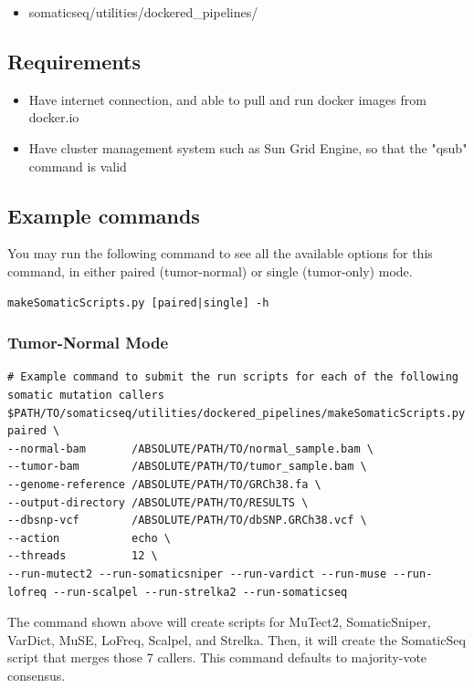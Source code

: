 \documentclass[10pt,letterpaper]{article}
\begin{document}
\begin{sloppypar}
  \begin{itemize}
    \item somaticseq/utilities/dockered\_pipelines/
  \end{itemize}

\subsection{Requirements}

  \begin{itemize}
    \item Have internet connection, and able to pull and run docker images from docker.io
    \item Have cluster management system such as Sun Grid Engine, so that the "qsub" command is valid
  \end{itemize}


\subsection{Example commands}

You may run the following command to see all the available options for this command, in either paired (tumor-normal) or single (tumor-only) mode.

\begin{lstlisting}
makeSomaticScripts.py [paired|single] -h
\end{lstlisting} 

\subsubsection{Tumor-Normal Mode}

\begin{lstlisting}
# Example command to submit the run scripts for each of the following somatic mutation callers
$PATH/TO/somaticseq/utilities/dockered_pipelines/makeSomaticScripts.py paired \
--normal-bam       /ABSOLUTE/PATH/TO/normal_sample.bam \
--tumor-bam        /ABSOLUTE/PATH/TO/tumor_sample.bam \
--genome-reference /ABSOLUTE/PATH/TO/GRCh38.fa \
--output-directory /ABSOLUTE/PATH/TO/RESULTS \
--dbsnp-vcf        /ABSOLUTE/PATH/TO/dbSNP.GRCh38.vcf \
--action           echo \
--threads          12 \
--run-mutect2 --run-somaticsniper --run-vardict --run-muse --run-lofreq --run-scalpel --run-strelka2 --run-somaticseq
\end{lstlisting}

The command shown above will create scripts for MuTect2, SomaticSniper, VarDict, MuSE, LoFreq, Scalpel, and Strelka. Then, it will create the SomaticSeq script that merges those 7 callers. This command defaults to majority-vote consensus.


\end{sloppypar}
\end{document}
